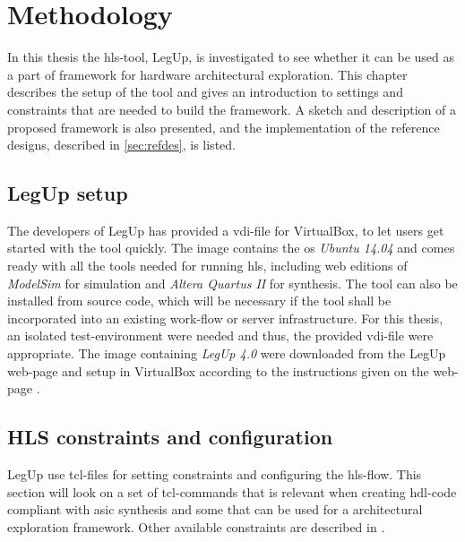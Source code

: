 \chapter{Methodology}
\label{chp:methodology} 
In this thesis the \gls{hls}-tool, LegUp, is investigated to see whether it can be used as a part of framework for hardware architectural exploration. This chapter describes the setup of the tool and gives an introduction to settings and constraints that are needed to build the framework. A sketch and description of a proposed framework is also presented, and the implementation of the reference designs, described in \cref{sec:refdes}, is listed.
\section{LegUp setup}
The developers of LegUp has provided a \gls{vdi}-file for VirtualBox, to let users get started with the tool quickly. The image contains the \gls{os} \textit{Ubuntu 14.04} and comes ready with all the tools needed for running \gls{hls}, including web editions of \textit{ModelSim} for simulation and \textit{Altera Quartus II} for synthesis. The tool can also be installed from source code, which will be necessary if the tool shall be incorporated into an existing work-flow or server infrastructure.
For this thesis, an isolated test-environment were needed and thus, the provided \gls{vdi}-file were appropriate. The image containing \textit{LegUp 4.0} were downloaded from the LegUp web-page and setup in VirtualBox according to the instructions given on the web-page \cite{legupgetstarted}. 

\section{HLS constraints and configuration}
LegUp use \gls{tcl}-files for setting constraints and configuring the \gls{hls}-flow. This section will look on a set of \gls{tcl}-commands that is relevant when creating \gls{hdl}-code compliant with \gls{asic} synthesis and some that can be used for a architectural exploration framework. Other available constraints are described in \cite{legupconst}.
